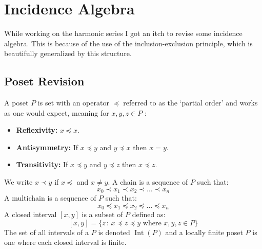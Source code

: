 
\section{Incidence Algebra}
While working on the harmonic series I got an itch to revise some incidence algebra.
This is because of the use of the inclusion-exclusion principle,
which is beautifully generalized by this structure. 

\subsection{Poset Revision}
A poset $P$ is set with an operator $\preceq$ referred to as the `partial order' and works as one would expect, meaning for $x,y,z\in P$ :
\begin{itemize}
	\item {\bf Reflexivity:}  $x\preceq x$.
	\item {\bf Antisymmetry:}  If $x\preceq y$ and $y\preceq x$ then $x=y$.
	\item {\bf Transitivity:}  If $x\preceq y$ and $y\preceq z$ then $x\preceq z$.
\end{itemize}
We write $x\prec y$ if $x\preceq$ and $x\neq y$.
A chain is a sequence of $P$ such that:
\[x_0\prec x_1 \prec x_2 \prec \dots \prec x_n\]
A multichain is a sequence of $P$ such that:
\[x_0\preceq x_1 \preceq x_2 \preceq \dots \preceq x_n\]
A closed interval $[x,y]$ is a subset of $P$ defined as:
\[[x,y] = \{z\,:\,x\preceq z\preceq y \text{ where }x,y,z\in P\}\]
The set of all intervals of a $P$ is denoted $\operatorname{Int}(P)$ and a locally finite poset $P$ is one where each closed interval is finite.

